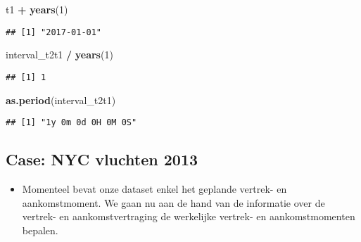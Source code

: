 \documentclass[]{memoir}
\newenvironment{Shaded}{\begin{snugshade}}{\end{snugshade}}
\newcommand{\DecValTok}[1]{\textcolor[rgb]{0.00,0.00,0.81}{#1}}
\newcommand{\KeywordTok}[1]{\textcolor[rgb]{0.13,0.29,0.53}{\textbf{#1}}}
\newcommand{\NormalTok}[1]{#1}
\newcommand{\OperatorTok}[1]{\textcolor[rgb]{0.81,0.36,0.00}{\textbf{#1}}}
\newcommand{\StringTok}[1]{\textcolor[rgb]{0.31,0.60,0.02}{#1}}
\providecommand{\tightlist}{%
  \setlength{\itemsep}{0pt}\setlength{\parskip}{0pt}}
\begin{document}
\begin{Shaded}
\begin{Highlighting}[]
\NormalTok{t1 }\OperatorTok{+}\StringTok{ }\KeywordTok{years}\NormalTok{(}\DecValTok{1}\NormalTok{)}
\end{Highlighting}
\end{Shaded}

\begin{verbatim}
## [1] "2017-01-01"
\end{verbatim}

\begin{Shaded}
\begin{Highlighting}[]
\NormalTok{interval_t2t1 }\OperatorTok{/}\StringTok{ }\KeywordTok{years}\NormalTok{(}\DecValTok{1}\NormalTok{)}
\end{Highlighting}
\end{Shaded}

\begin{verbatim}
## [1] 1
\end{verbatim}

\begin{Shaded}
\begin{Highlighting}[]
\KeywordTok{as.period}\NormalTok{(interval_t2t1)}
\end{Highlighting}
\end{Shaded}

\begin{verbatim}
## [1] "1y 0m 0d 0H 0M 0S"
\end{verbatim}

\hypertarget{case-nyc-vluchten-2013-1}{%
\subsection{Case: NYC vluchten 2013}\label{case-nyc-vluchten-2013-1}}

\begin{itemize}
\tightlist
\item
  Momenteel bevat onze dataset enkel het geplande vertrek- en aankomstmoment. We gaan nu aan de hand van de informatie over de vertrek- en aankomstvertraging de werkelijke vertrek- en aankomstmomenten bepalen.
\end{itemize}
\end{document}
